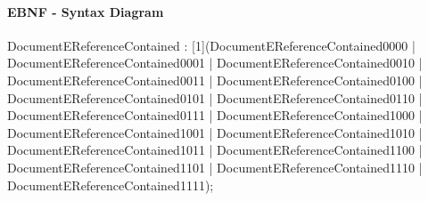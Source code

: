 \documentclass[11pt,a4paper]{article}
\begin{document}
\paragraph{EBNF - Syntax Diagram}
\begin{rail}
DocumentEReferenceContained : [1](DocumentEReferenceContained0000 | DocumentEReferenceContained0001 | DocumentEReferenceContained0010 | DocumentEReferenceContained0011 | DocumentEReferenceContained0100 | DocumentEReferenceContained0101 | DocumentEReferenceContained0110 | DocumentEReferenceContained0111 | DocumentEReferenceContained1000 | DocumentEReferenceContained1001 | DocumentEReferenceContained1010 | DocumentEReferenceContained1011 | DocumentEReferenceContained1100 | DocumentEReferenceContained1101 | DocumentEReferenceContained1110 | DocumentEReferenceContained1111);
\end{rail}
\end{document}
